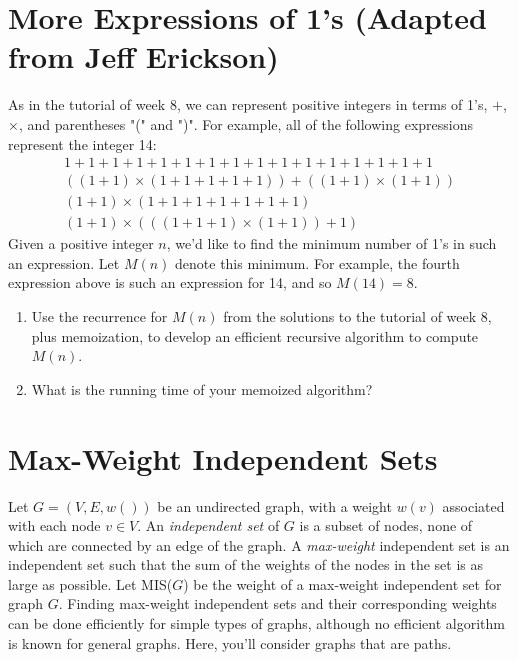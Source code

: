 \documentclass[11pt]{article}
\def\question#1{\red{#1}}
\def\red#1{{\color{red}#1}}
\begin{document}
\section{More Expressions of 1's (Adapted from Jeff Erickson)}
\label{sec-3}

As in the tutorial of week 8, we can represent positive integers in
terms of 1's, $+$, $\times$, and parentheses "(" and ")".  For
example, all of the following expressions represent the integer 14:
\[
\begin{array}{l}
1 + 1 + 1 + 1 + 1 + 1 + 1 + 1 + 1 + 1 + 1 + 1 + 1 + 1 + 1 + 1 \\
((1 + 1) \times (1 + 1 + 1 + 1 + 1)) + ((1 + 1) \times (1 + 1)) \\
(1 + 1) \times (1 + 1 + 1 + 1 + 1 + 1 + 1) \\
(1 + 1) \times (((1 + 1 + 1) \times (1 + 1)) + 1) 
\end{array}
\]
Given a positive integer $n$, we'd like to find the minimum number of
1's in such an expression.  Let $M(n)$ denote this minimum.  For
example, the fourth expression above is such an expression for 14, and
so $M(14) = 8$.

\begin{enumerate}
\item \question{Use the recurrence for $M(n)$ from the solutions to the tutorial of week 8, plus memoization, to develop an efficient recursive algorithm to compute $M(n)$.}

\item \question{What is the running time of your memoized algorithm?}
\end{enumerate}

\section{Max-Weight Independent Sets}
\label{sec-4}
Let $G=(V,E,w())$ be an undirected graph, with a weight $w(v)$
associated with each node $v\in V$.  An \emph{independent set} of $G$ is a
subset of nodes, none of which are connected by an edge of the
graph. A \emph{max-weight} independent set is an
independent set such that the sum of the weights of the nodes in the
set is as large as possible. 
Let MIS($G$) be the weight of a max-weight independent set for graph $G$.
Finding max-weight independent sets and their corresponding weights
can be done efficiently for simple types of graphs, although no efficient
algorithm is known for general graphs. Here, you'll consider graphs
that are paths.
\end{document}
